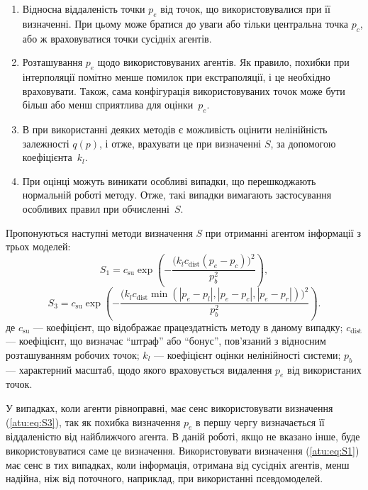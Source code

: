 \begin{enumerate}

  \item
    Відносна віддаленість точки
    $ p_e $ від точок, що використовувалися при її визначенні. При
    цьому може братися до уваги або тільки центральна точка
    $ p_c $, або ж враховуватися точки сусідніх агентів.

  \item
    Розташування
    $ p_e $ щодо використовуваних агентів. Як правило, похибки при
    інтерполяції помітно менше помилок при екстраполяції,
    і це необхідно враховувати. Також, сама конфігурація
    використовуваних точок може бути більш або менш сприятлива для
    оцінки~$p_e$.

  \item
    В при використанні деяких методів є можливість оцінити
    нелінійність залежності
    $q(p)$, і отже, врахувати це при визначенні
    $ S $, за допомогою коефіцієнта~$k_l$.

  \item
    При оцінці можуть виникати особливі випадки, що перешкоджають
    нормальній роботі методу. Отже, такі випадки вимагають
    застосування особливих правил при обчисленні~$S$.

\end{enumerate}

Пропонуються наступні
методи визначення $S$ при отриманні агентом інформації з трьох моделей:
%
\begin{equation}
  S_1 = c_\mathrm{su} \exp \left( - \frac{ \big( k_l c_\mathrm{dist} ( p_e - p_c ) \big)^2 }{p_b^2} \right)
  ,
  \label{atu:eq:S1}
\end{equation}
%
\begin{equation}
  S_3 = c_\mathrm{su} \exp \left( - \frac{ \big( k_l c_\mathrm{dist} \min( |p_e - p_l|,|p_e - p_c|, |p_e - p_r| ) \big)^2 }{p_b^2} \right)
  .
  \label{atu:eq:S3}
\end{equation}
%
де
$c_\mathrm{su}$ ---
коефіцієнт, що відображає працездатність методу в даному випадку;
$c_\mathrm{dist}$ ---
коефіцієнт, що визначає ``штраф'' або ``бонус'', пов'язаний з відносним розташуванням робочих точок;
$k_l$ ---
коефіцієнт оцінки нелінійності системи;
$p_b$ ---
характерний масштаб, щодо якого враховується видалення $p_e$ від використаних точок.


У випадках, коли агенти рівноправні, має сенс використовувати визначення
(\ref{atu:eq:S3}), так як похибка визначення $p_e$ в першу чергу визначається її
віддаленістю від найближчого агента. В даній роботі, якщо не вказано інше, буде
використовуватися саме це визначення.
Використовувати визначення (\ref{atu:eq:S1}) має сенс в тих випадках,
коли інформація, отримана від сусідніх агентів, менш надійна,
ніж від поточного, наприклад, при використанні псевдомоделей.

